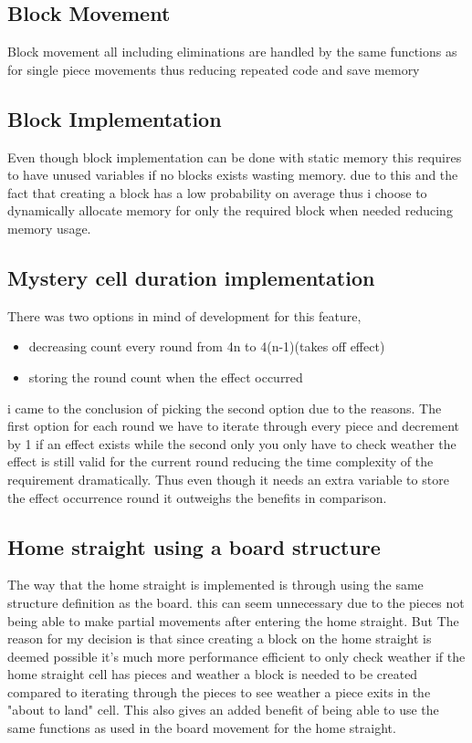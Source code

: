 \documentclass{article}
\begin{document}
\subsection{Block Movement}

Block movement all including eliminations are handled by the same functions as for single piece movements thus reducing repeated code and save memory

\subsection{Block Implementation}

Even though block implementation can be done with static memory this requires to have unused variables if no blocks exists wasting memory. due to this and the fact that creating a block has a low probability on average thus i choose to dynamically allocate memory for only the required block when needed reducing memory usage.

\subsection{Mystery cell duration implementation}

There was two options in mind of development for this feature,
\begin{itemize}
    \item decreasing count every round from 4n to 4(n-1)(takes off effect)
    \item storing the round count when the effect occurred
\end{itemize}

i came to the conclusion of picking the second option due to the reasons. The first option for each round we have to iterate through every piece and decrement by 1 if an effect exists while the second only you only have to check weather the effect is still valid for the current round reducing the time complexity of the requirement dramatically. Thus even though it needs an extra variable to store the effect occurrence round it outweighs the benefits in comparison. 

\subsection{Home straight using a board structure}

The way that the home straight is implemented is through using the same structure definition as the board. this can seem unnecessary due to the pieces not being able to make partial movements after entering the home straight. But The reason for my decision is that since creating a block on the home straight is deemed possible it's much more performance efficient to only check weather if the home straight cell has pieces and weather a block is needed to be created compared to iterating through the pieces to see weather a piece exits in the "about to land" cell. This also gives an added benefit of being able to use the same functions as used in the board movement for the home straight.
\end{document}
